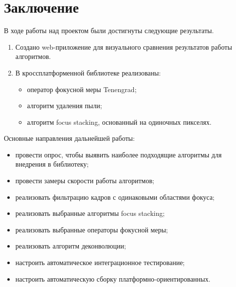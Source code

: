 \documentclass[14pt]{matmex-diploma-custom}
\begin{document}
\section*{Заключение}
В ходе работы над проектом были достигнуты следующие результаты.
\begin{enumerate}
    \item Создано web-приложение для визуального сравнения результатов работы алгоритмов. 
    \item В кроссплатформенной библиотеке реализованы:
        \begin{itemize}
            \item оператор фокусной меры Tenengrad;
            \item алгоритм удаления пыли;
            \item алгоритм focus stacking, основанный на одиночных пикселях.
        \end{itemize}
\end{enumerate}

\par
Основные направления дальнейшей работы:
\begin{itemize}
    \item провести опрос, чтобы выявить наиболее подходящие алгоритмы для внедрения в библиотеку;
    \item провести замеры скорости работы алгоритмов;
    \item реализовать фильтрацию кадров с одинаковыми областями фокуса;
    \item реализовать выбранные алгоритмы focus stacking;
    \item реализовать выбранные операторы фокусной меры;
    \item реализовать алгоритм деконволюции;
    \item настроить автоматическое интеграционное тестирование;
    \item настроить автоматическую сборку платформно-ориентированных.
\end{itemize}

\setmonofont[Mapping=tex-text]{CMU Typewriter Text}


\end{document}
